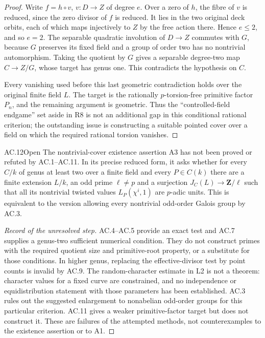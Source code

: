 \begin{proof}
Write $f=h\circ v$, $v:D\to Z$ of degree $e$.  Over a zero of $h$, the
fibre of $v$ is reduced, since the zero divisor of $f$ is reduced.  It
lies in the two original deck orbits, each of which maps injectively to
$Z$ by the free action there.  Hence $e\le2$, and so $e=2$.
The separable quadratic involution of $D\to Z$ commutes with $G$, because
$G$ preserves its fixed field and a group of order two has no nontrivial
automorphism.  Taking the quotient by $G$ gives a separable degree-two
map $C\to Z/G$, whose target has genus one.  This contradicts the
hypothesis on $C$.

Every vanishing used before this last geometric contradiction holds over
the original finite field $L$.  The target is the rationally
$p$-torsion-free primitive factor $P_n$, and the remaining argument is
geometric.  Thus the ``controlled-field endgame'' set aside in R8 is not
an additional gap in this conditional rational criterion; the outstanding
issue is constructing a suitable pointed cover over a field on which the
required rational torsion vanishes.
\end{proof}

\begin{claim}{AC.12}{Open}
The nontrivial-cover existence assertion A3 has not been proved or refuted
by AC.1--AC.11.  In its precise reduced form, it asks whether for every
$C/k$ of genus at least two over a finite field and every $P\in C(k)$
there are a finite extension $L/k$, an odd prime $\ell\ne p$ and a
surjection $J_C(L)\to\mathbf Z/\ell$ such that all its nontrivial
twisted values $L_P(\chi^i,1)$ are $p$-adic units.  This is equivalent to
the version allowing every nontrivial odd-order Galois group by AC.3.
\end{claim}
\begin{proof}[Record of the unresolved step]
AC.4--AC.5 provide an exact test and AC.7 supplies a genus-two sufficient
numerical condition.  They do not construct primes with the required
quotient size and primitive-root property, or a substitute for those
conditions.  In higher genus, replacing the effective-divisor test by
point counts is invalid by AC.9.  The random-character estimate in L2 is
not a theorem: character values for a fixed curve are constrained,
and no independence or equidistribution statement with those parameters
has been established.  AC.3 rules out the suggested enlargement to
nonabelian odd-order groups for this particular criterion.  AC.11 gives
a weaker primitive-factor target but does not construct it.  These are
failures of the attempted methods, not counterexamples to the existence
assertion or to A1.
\end{proof}

